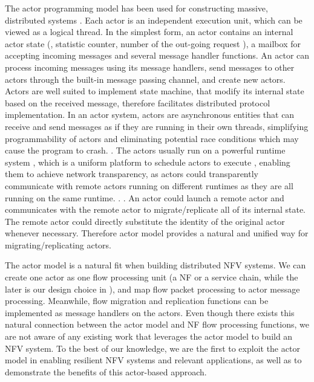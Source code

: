 The actor programming model has been used for constructing massive, distributed systems \cite{actor-wiki, akka, newell2016optimizing, AnalysisActor}. Each actor is an independent execution unit, which can be viewed as a logical thread. In the simplest form, an actor contains an internal actor state (\eg, statistic counter, \ac{number of the out-going request} ), a mailbox for accepting incoming messages and several message handler functions. An actor can process incoming messages using its message handlers, send messages to other actors through the built-in message passing channel, and create new actors. \ac{Actors are well suited to implement state machine, that modify its internal state based on the received message, therefore facilitates distributed protocol implementation.}  In an actor system, actors are asynchronous entities that can receive and send messages as if they are running \ac{in their own threads, simplifying programmability of actors and eliminating potential race conditions which may cause the program to crash.} . The actors usually run on a powerful runtime system \cite{erlang, akka, caf}, \ac{which is a uniform platform to schedule actors to execute} , enabling them to achieve network transparency, \ac{as actors could transparently communicate with remote actors running on different runtimes as they are all running on the same runtime.}  . . \ac{An actor could launch a remote actor and communicates with the remote actor to migrate/replicate all of its internal state. The remote actor could directly substitute the identity of the original actor whenever necessary. Therefore actor model provides a natural and unified way for migrating/replicating actors.}

The actor model is a natural fit when building distributed NFV systems. We can create one actor as one flow processing unit (a NF or a service chain, while the later is our design choice in \nfactor), and map flow packet processing to actor message processing. Meanwhile, flow migration and replication functions can be implemented as message handlers on the actors. Even though there exists this natural connection between the actor model and NF flow processing functions, we are not aware of any existing work that leverages the actor model to build an NFV system. %
 To the best of our knowledge, we are the first to exploit the actor model in enabling resilient NFV systems and relevant applications, as well as to demonstrate the benefits of this actor-based approach.


